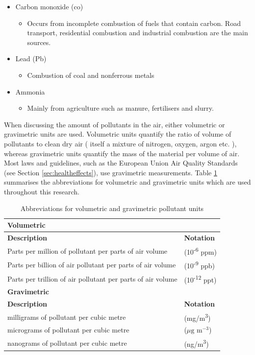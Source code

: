 \begin{itemize}
\item Carbon monoxide (\gls{co})
\begin{itemize}
\item Occurs from incomplete combustion of fuels that contain carbon. Road transport, residential combustion and industrial combustion are the main sources.
\end{itemize}
\item Lead (Pb)
\begin{itemize}
\item Combustion of coal and nonferrous metals
\end{itemize}
\item Ammonia
\begin{itemize}
\item Mainly from agriculture such as manure, fertilisers and slurry.
\end{itemize}
\end{itemize}

When discussing the amount of pollutants in the air, either volumetric or gravimetric units are used. Volumetric units quantify the ratio of volume of pollutants to clean dry air ( itself a mixture of nitrogen, oxygen, argon etc. ), whereas gravimetric units  quantify the mass of the material per volume of air. Most laws and guidelines, such as the European Union Air Quality Standards (see Section \ref{sec:healtheffects}), use gravimetric measurements. Table \ref{tab:pollution_units} summarises the abbreviations for volumetric and gravimetric units which are used throughout this research.

\begin{table}[H]
\caption{Abbreviations for volumetric and gravimetric pollutant units}
\centering
    \begin{tabular}{ | l | l |}
    \hline 
     \textbf{Volumetric} & \\ \hline
     \textbf{Description} & \textbf{Notation} \\ \hline
      Parts per million of pollutant per parts of air volume & (10\textsuperscript{-6} ppm) \\ \hline
     Parts per billion of air pollutant per parts of air volume & (10\textsuperscript{-9} ppb) \\ \hline
     Parts per trillion of air pollutant per parts of air volume & (10\textsuperscript{-12} ppt) \\ \hline
     \textbf{Gravimetric} & \\ \hline
     \textbf{Description} & \textbf{Notation} \\ \hline
     milligrams of pollutant per cubic metre & (mg/m\textsuperscript{3}) \\ \hline
     micrograms of pollutant per cubic metre & ($\mu \text{g m}^{-3}$) \\ \hline
     nanograms of pollutant per cubic metre & (ng/m\textsuperscript{3}) \\ \hline
    \end{tabular}
\label{tab:pollution_units}
\end{table}
 
